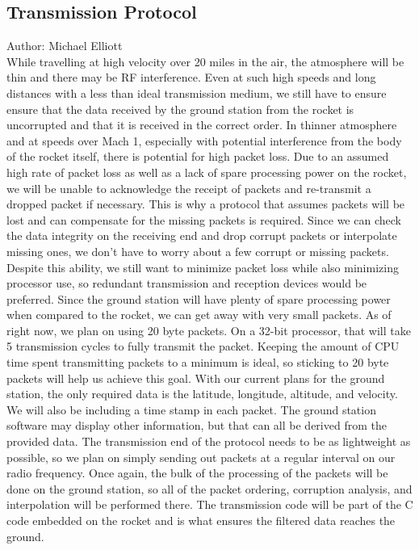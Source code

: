\documentclass[onecolumn, draftclsnofoot,10pt, compsoc]{IEEEtran}
\begin{document}
\subsection {Transmission Protocol}
Author: Michael Elliott\\
While travelling at high velocity over 20 miles in the air, the
atmosphere will be thin and there may be RF interference.
Even at such high speeds and long distances with a less than ideal
transmission medium, we still have to ensure ensure that the data
received by the ground station from the rocket is uncorrupted and that
it is received in the correct order.
In thinner atmosphere and at speeds over Mach 1, especially with
potential interference from the body of the rocket itself, there is
potential for high packet loss.
Due to an assumed high rate of packet loss as well as a lack of spare
processing power on the rocket, we will be unable to acknowledge the
receipt of packets and re-transmit a dropped packet if necessary.
This is why a protocol that assumes packets will be lost and can
compensate for the missing packets is required.
Since we can check the data integrity on the receiving end and drop
corrupt packets or interpolate missing ones, we don't have to worry
about a few corrupt or missing packets.
Despite this ability, we still want to minimize packet loss while also
minimizing processor use, so redundant transmission and reception
devices would be preferred.
Since the ground station will have plenty of spare processing power
when compared to the rocket, we can get away with very small packets.
As of right now, we plan on using 20 byte packets.
On a 32-bit processor, that will take 5 transmission cycles to fully
transmit the packet.
Keeping the amount of CPU time spent transmitting packets to a minimum
is ideal, so sticking to 20 byte packets will help us achieve this
goal.
With our current plans for the ground station, the only required data
is the latitude, longitude, altitude, and velocity.
We will also be including a time stamp in each packet.
The ground station software may display other information, but that
can all be derived from the provided data.
The transmission end of the protocol needs to be as lightweight as
possible, so we plan on simply sending out packets at a regular
interval on our radio frequency.
Once again, the bulk of the processing of the packets will be done on
the ground station, so all of the packet ordering, corruption
analysis, and interpolation will be performed there.
The transmission code will be part of the C code embedded on the
rocket and is what ensures the filtered data reaches the ground.
\end{document}
